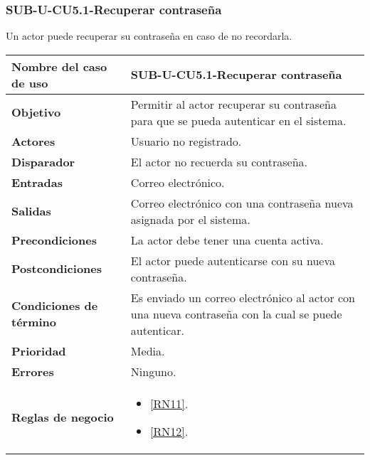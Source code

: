 \subsubsection{SUB-U-CU5.1-Recuperar contraseña}\label{SUB-U-CU5.1}
Un actor puede recuperar su contraseña en caso de no recordarla.
\begin{longtable}{|J{5cm}|J{10.3cm}|}
	\hline
	\textbf{Nombre del caso de uso} &
		SUB-U-CU5.1-Recuperar contraseña \\ \hline
	\textbf{Objetivo} &
		Permitir al actor recuperar su contraseña para que se pueda autenticar en el sistema. \\ \hline
	\textbf{Actores} &
		Usuario no registrado. \\ \hline 
	\textbf{Disparador} & 
		El actor no recuerda su contraseña. \\ \hline 
	\textbf{Entradas} & Correo electrónico.
		\\ \hline 
	\textbf{Salidas} & Correo electrónico con una contraseña nueva asignada por el sistema.
		\\ \hline
	\textbf{Precondiciones} &
		La actor debe tener una cuenta activa.\\ \hline
	\textbf{Postcondiciones} & El actor puede autenticarse con su nueva contraseña.
		\\ \hline
	\textbf{Condiciones de término} & Es enviado un correo electrónico al actor con una nueva contraseña con la cual se puede autenticar.
		\\ \hline 
	\textbf{Prioridad} & 
		Media. \\ \hline
	\textbf{Errores} & Ninguno.
		\\ \hline
	\textbf{Reglas de negocio} & 
		\begin{itemize}
			\item \ref{RN11}.
			\item \ref{RN12}.
		\end{itemize}
		 \\ \hline
\end{longtable}

